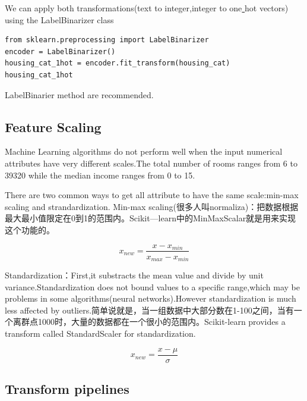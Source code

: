 \documentclass[UTF8]{ctexart}
\begin{document}
We can apply both transformations(text to integer,integer to one\underline{ }hot vectors) using the LabelBinarizer class

\begin{lstlisting}
from sklearn.preprocessing import LabelBinarizer
encoder = LabelBinarizer()
housing_cat_1hot = encoder.fit_transform(housing_cat)
housing_cat_1hot
\end{lstlisting}
LabelBinarier method are recommended.

\subsection{Feature Scaling}

Machine Learning algorithms do not perform well when the input numerical attributes have very different scales.The total number of rooms ranges from 6 to 39320 while the median income ranges from 0 to 15.

There are two common ways to get all attribute to have the same scale:min-max scaling and strandardization.
Min-max scaling(很多人叫normaliza)：把数据根据最大最小值限定在0到1的范围内。Scikit—learn中的MinMaxScalar就是用来实现这个功能的。

\begin{equation}
x_{new} = \frac{x-x_{min}}{x_{max}-x_{min}}
\end{equation}

Standardization：First,it substracts the mean value and divide by unit variance.Standardization does not bound values to a specific range,which may be problems in some algorithms(neural networks).However standardization is much less affected by outliers.简单说就是，当一组数据中大部分数在1-100之间，当有一个离群点1000时，大量的数据都在一个很小的范围内。Scikit-learn provides a transform called StandardScaler for standardization.

\begin{equation}
x_{new}  = \frac{x-\mu}{\sigma}
\end{equation}

\subsection{Transform pipelines}
\end{document}
